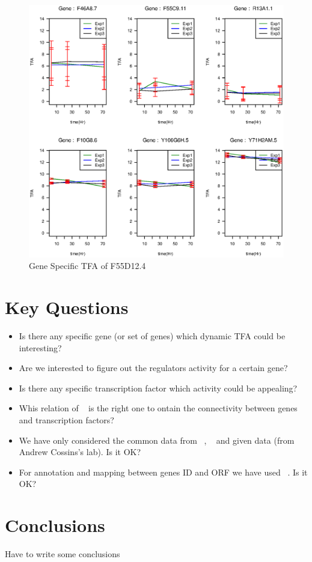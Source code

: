 \documentclass[a4paper,10pt]{report}
\begin{document}
\begin{figure}[!htb]
  \includegraphics[width=1.0\linewidth]{picture/F55D12_4_3dp_HS_LC_tfid8.eps}
  \caption{Gene Specific TFA of F55D12.4}
  \label{fig:F55D12.4}
\end{figure}


\section{Key Questions}\label{conclusions}

\begin{itemize}
	\item Is there any specific gene (or set of genes) which dynamic TFA could be interesting?
	\item Are we interested to figure out the regulators activity for a certain gene?
	\item Is there any specific transcription factor which activity could be appealing?
	\item Whis relation of ~\cite{wormnet:url} is the right one to ontain the connectivity
	      between genes and transcription factors?
	\item We have only considered the common data from ~\cite{wormnet:url}, ~\cite{edgedb:01} 
	      and given data (from Andrew Cossins's lab). Is it OK? 
	\item For annotation and mapping between genes ID and ORF we have used ~\cite{celegans:db}.
	      Is it OK?
\end{itemize}	      
      
      

\section{Conclusions}\label{conclusions}

Have to write some conclusions


%
%



\end{document}
